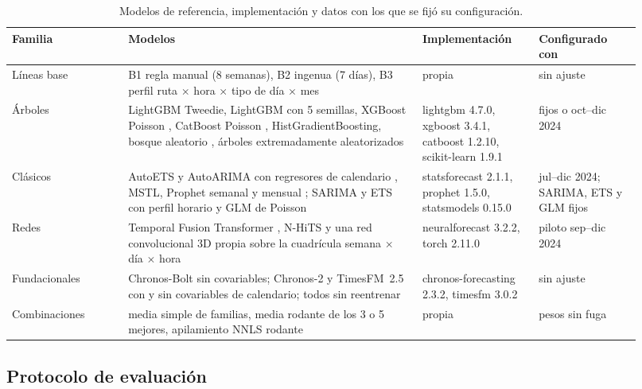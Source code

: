 \begin{table}[t]
  \centering\small
  \caption{Modelos de referencia, implementación y datos con los que se fijó su configuración.}
  \label{tab:referencias}
  \begin{tabular}{@{}>{\raggedright\arraybackslash}p{0.17\linewidth} >{\raggedright\arraybackslash}p{0.43\linewidth} >{\raggedright\arraybackslash}p{0.17\linewidth} >{\raggedright\arraybackslash}p{0.15\linewidth}@{}}
    \toprule
    Familia & Modelos & Implementación & Configurado con \\
    \midrule
    Líneas base & B1 regla manual (8 semanas), B2 ingenua (7 días), B3 perfil ruta $\times$ hora $\times$ tipo de día $\times$ mes & propia & sin ajuste \\
    Árboles & LightGBM Tweedie, LightGBM con 5 semillas, XGBoost Poisson \citep{chen2016xgboost}, CatBoost Poisson \citep{prokhorenkova2018catboost}, HistGradientBoosting, bosque aleatorio \citep{breiman2001rf}, árboles extremadamente aleatorizados & lightgbm 4.7.0, xgboost 3.4.1, catboost 1.2.10, scikit-learn 1.9.1 & fijos o oct--dic 2024 \\
    Clásicos & AutoETS y AutoARIMA con regresores de calendario \citep{hyndman2008ets}, MSTL, Prophet semanal y mensual \citep{taylor2018prophet}; SARIMA y ETS con perfil horario y GLM de Poisson & statsforecast 2.1.1, prophet 1.5.0, statsmodels 0.15.0 & jul--dic 2024; SARIMA, ETS y GLM fijos \\
    Redes & Temporal Fusion Transformer \citep{lim2021tft}, N-HiTS \citep{challu2023nhits} y una red convolucional 3D propia sobre la cuadrícula semana $\times$ día $\times$ hora & neuralforecast 3.2.2, torch 2.11.0 & piloto sep--dic 2024 \\
    Fundacionales & Chronos-Bolt sin covariables; Chronos-2 \citep{ansari2025chronos2} y TimesFM~2.5 \citep{das2024timesfm} con y sin covariables de calendario; todos sin reentrenar & chronos-forecasting 2.3.2, timesfm 3.0.2 & sin ajuste \\
    Combinaciones & media simple de familias, media rodante de los 3 o 5 mejores, apilamiento NNLS rodante & propia & pesos sin fuga \\
    \bottomrule
  \end{tabular}
\end{table}

\subsection{Protocolo de evaluación}
\label{sec:protocolo}


